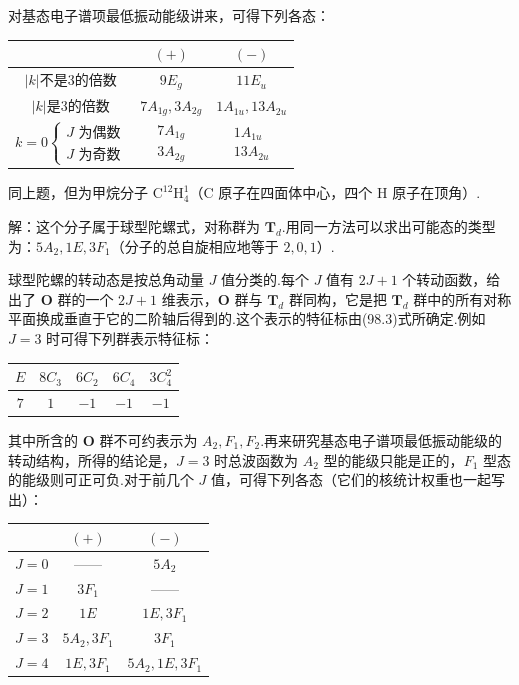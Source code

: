 \begin{xiti}
对基态电子谱项最低振动能级讲来，可得下列各态：
\begin{center}
\begin{tabular}{|c|c|c|}
\hline
  & $(+)$ & $(-)$\\ \hline
  $|k|$不是3的倍数 & $9E_g$ & $11E_u$\\ \hline
  $|k|$是3的倍数 & $7A_{1g},3A_{2g}$ & $1A_{1u},13A_{2u}$\\ \hline
  $k=0\left\{\begin{array}{l}J\text{ 为偶数}\\ J\text{ 为奇数}\end{array}\right.$
  & $\begin{array}{c}7A_{1g}\\ 3A_{2g}\end{array}$
  & $\begin{array}{c}1A_{1u}\\ 13A_{2u}\end{array}$\\ \hline
\end{tabular}
\end{center}

\quad 同上题，但为甲烷分子 $\mathrm{C^{12}H_4^1}$（C 原子在四面体中心，四个 H 原子在顶角）.

解：这个分子属于球型陀螺式，对称群为 $\boldsymbol{T}_d$.用同一方法可以求出可能态的类型为：$5A_2,1E,3F_1$（分子的总自旋相应地等于 $2,0,1$）.

球型陀螺的转动态是按总角动量 $J$ 值分类的.每个 $J$ 值有 $2J+1$ 个转动函数，给出了 $\boldsymbol{O}$ 群的一个 $2J+1$ 维表示，$\boldsymbol{O}$ 群与 $\boldsymbol{T}_d$ 群同构，它是把 $\boldsymbol{T}_d$ 群中的所有对称平面换成垂直于它的二阶轴后得到的.这个表示的特征标由(98.3)式所确定.例如 $J=3$ 时可得下列群表示特征标：
\begin{center}
\begin{tabular}{|c|c|c|c|c|}
\hline
  $E$ & $8C_3$ & $6C_2$ & $6C_4$ & $3C_4^2$\\ \hline
  $7$ & $1$ & $-1$ & $-1$ & $-1$\\ \hline
\end{tabular}
\end{center}
其中所含的 $\boldsymbol{O}$ 群不可约表示为 $A_2,F_1,F_2$.再来研究基态电子谱项最低振动能级的转动结构，所得的结论是，$J=3$ 时总波函数为 $A_2$ 型的能级只能是正的，$F_1$ 型态的能级则可正可负.对于前几个 $J$ 值，可得下列各态（它们的核统计权重也一起写出）：
\begin{center}
\begin{tabular}{|c|c|c|}
\hline
  & $(+)$ & $(-)$\\ \hline
  $J=0$ & —— & $5A_2$\\ \hline
  $J=1$ & $3F_1$ & ——\\ \hline
  $J=2$ & $1E$ & $1E,3F_1$\\ \hline
  $J=3$ & $5A_2,3F_1$ & $3F_1$\\ \hline
  $J=4$ & $1E,3F_1$ & $5A_2,1E,3F_1$\\ \hline
\end{tabular}
\end{center}

\end{xiti}
\renewcommand{\theequation}{\arabic{section}.\arabic{equation}}%
